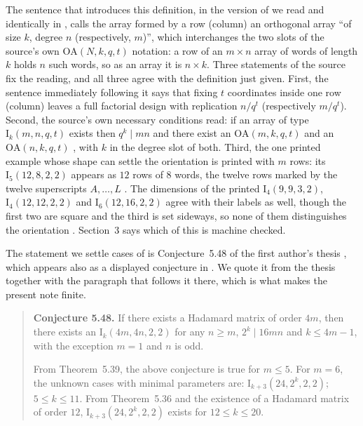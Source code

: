 \documentclass[11pt]{amsart}
\newcommand{\Idesign}{\mathrm{I}}
\newcommand{\OA}{\mathrm{OA}}
\begin{document}
The sentence that introduces this definition, in the version of \cite{RC2023} we read and
identically in \cite[p.~79]{Rahim2023thesis}, calls the array formed by a row (column) an orthogonal array ``of
size $k$, degree $n$ (respectively, $m$)'', which interchanges the two slots of the source's own
$\OA(N,k,q,t)$ notation: a row of an $m\times n$ array of words of length $k$ holds $n$ such words,
so as an array it is $n\times k$. Three statements of the source fix the reading, and all three
agree with the definition just given. First, the sentence immediately following it says that fixing
$t$ coordinates inside one row (column) leaves a full factorial design with replication $n/q^t$
(respectively $m/q^t$). Second, the source's own necessary conditions read: if an array of type
$\Idesign_k(m,n,q,t)$ exists then $q^k\mid mn$ and there exist an $\OA(m,k,q,t)$ and an
$\OA(n,k,q,t)$ \cite[p.~81]{Rahim2023thesis}, with $k$ in the degree slot of both. Third, the one
printed example whose shape can settle the orientation is printed with $m$ rows: its
$\Idesign_5(12,8,2,2)$ appears as $12$ rows of $8$ words, the twelve rows marked by the twelve
superscripts $A,\dots,L$ \cite[Table~5.3]{Rahim2023thesis}. The dimensions of the printed
$\Idesign_4(9,9,3,2)$, $\Idesign_4(12,12,2,2)$ and $\Idesign_6(12,16,2,2)$ agree with their labels
as well, though the first two are square and the third is set sideways, so none of them
distinguishes the orientation \cite[Tables~5.1,~5.5,~5.6]{Rahim2023thesis}. Section~3 says which of
this is machine checked.

The statement we settle cases of is Conjecture~5.48 of the first author's thesis
\cite[p.~114]{Rahim2023thesis}, which appears also as a displayed conjecture in \cite{RC2023}. We
quote it from the thesis together with the paragraph that follows it there, which is what makes the
present note finite.

\begin{quote}
\textbf{Conjecture 5.48.} If there exists a Hadamard matrix of order $4m$, then there exists an
$\Idesign_k(4m,4n,2,2)$ for any $n\ge m$, $2^k\mid 16mn$ and $k\le 4m-1$, with the exception $m=1$
and $n$ is odd.

From Theorem~5.39, the above conjecture is true for $m\le5$. For $m=6$, the
unknown cases with minimal parameters are: $\Idesign_{k+3}(24,2^k,2,2)$; $5\le k\le11$. From
Theorem~5.36 and the existence of a Hadamard matrix of order $12$,
$\Idesign_{k+3}(24,2^k,2,2)$ exists for $12\le k\le20$.
\end{quote}
\end{document}
